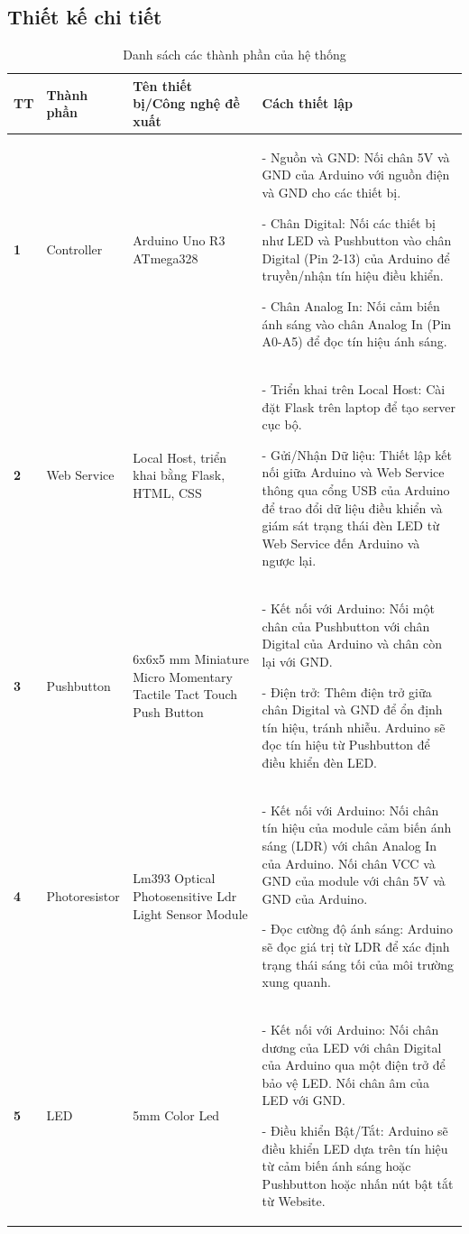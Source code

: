 \subsection{Thiết kế chi tiết}
\begin{table}[h!]
\centering
\small
\begin{tabular}{|p{0.6cm}|p{2.5cm}|p{3.5cm}|p{9cm}|}
\hline
\textbf{TT} & \textbf{Thành phần} & \textbf{Tên thiết bị/Công nghệ đề xuất} & \textbf{Cách thiết lập} \\ \hline
\textbf{1} & Controller & Arduino Uno R3 ATmega328 & 
- Nguồn và GND: Nối chân 5V và GND của Arduino với nguồn điện và GND cho các thiết bị.

- Chân Digital: Nối các thiết bị như LED và Pushbutton vào chân Digital (Pin 2-13) của Arduino để truyền/nhận tín hiệu điều khiển.

- Chân Analog In: Nối cảm biến ánh sáng vào chân Analog In (Pin A0-A5) để đọc tín hiệu ánh sáng.\\ \hline
\textbf{2} & Web Service & Local Host, triển khai bằng Flask, HTML, CSS & 
- Triển khai trên Local Host: Cài đặt Flask trên laptop để tạo server cục bộ.

- Gửi/Nhận Dữ liệu: Thiết lập kết nối giữa Arduino và Web Service thông qua cổng USB của Arduino để trao đổi dữ liệu điều khiển và giám sát trạng thái đèn LED từ Web Service đến Arduino và ngược lại. \\ \hline
\textbf{3} & Pushbutton & 6x6x5 mm Miniature Micro Momentary Tactile Tact Touch Push Button & 
- Kết nối với Arduino: Nối một chân của Pushbutton với chân Digital của Arduino và chân còn lại với GND.

- Điện trở: Thêm điện trở giữa chân Digital và GND để ổn định tín hiệu, tránh nhiễu. Arduino sẽ đọc tín hiệu từ Pushbutton để điều khiển đèn LED.\\ \hline
\textbf{4} & Photoresistor & Lm393 Optical Photosensitive Ldr Light Sensor Module & 
- Kết nối với Arduino: Nối chân tín hiệu của module cảm biến ánh sáng (LDR) với chân Analog In của Arduino. Nối chân VCC và GND của module với chân 5V và GND của Arduino.

- Đọc cường độ ánh sáng: Arduino sẽ đọc giá trị từ LDR để xác định trạng thái sáng tối của môi trường xung quanh. \\ \hline
\textbf{5} & LED & 5mm Color Led & 
- Kết nối với Arduino: Nối chân dương của LED với chân Digital của Arduino qua một điện trở để bảo vệ LED. Nối chân âm của LED với GND.

- Điều khiển Bật/Tắt: Arduino sẽ điều khiển LED dựa trên tín hiệu từ cảm biến ánh sáng hoặc Pushbutton hoặc nhấn nút bật tắt từ Website. \\ \hline
\end{tabular}

\caption{Danh sách các thành phần của hệ thống}
\label{tab:components}

\end{table}


